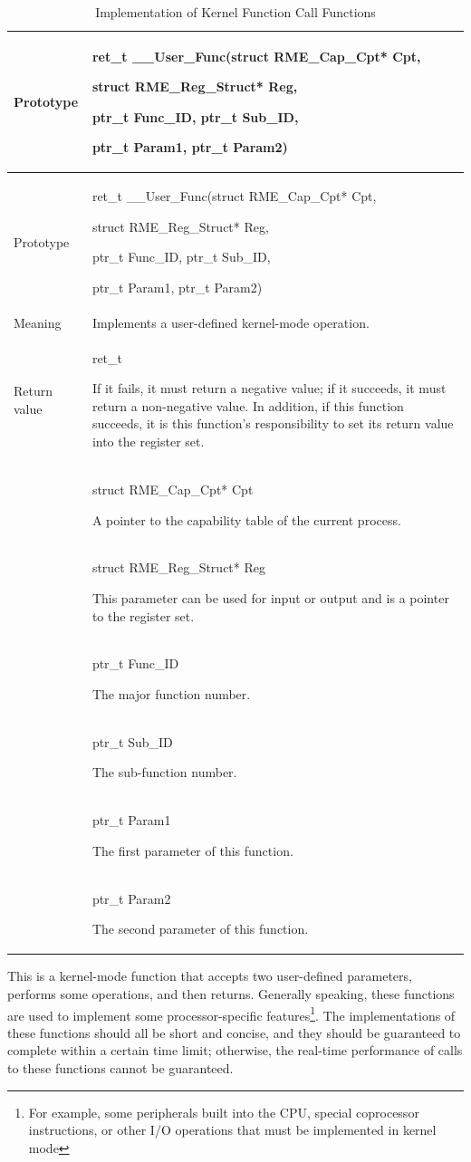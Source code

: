 \begin{xltabular}{\textwidth}{@{}>{\hsize\raggedright\arraybackslash}X>{\hsize\raggedright\arraybackslash}X@{}}
\caption{Implementation of Kernel Function Call Functions}\label{tab:7-73-kernel-function-call-function-implementation}\\
\toprule
Prototype\strut
 & ret\_t \_\_User\_Func(struct RME\_Cap\_Cpt* Cpt,

struct RME\_Reg\_Struct* Reg,

ptr\_t Func\_ID, ptr\_t Sub\_ID,

ptr\_t Param1, ptr\_t Param2)\strut
\tabularnewline
\endfirsthead
\toprule
Prototype\strut
 & ret\_t \_\_User\_Func(struct RME\_Cap\_Cpt* Cpt,

struct RME\_Reg\_Struct* Reg,

ptr\_t Func\_ID, ptr\_t Sub\_ID,

ptr\_t Param1, ptr\_t Param2)\strut
\tabularnewline
\midrule
\endhead
\bottomrule
\endlastfoot
Meaning & Implements a user-defined kernel-mode operation.\tabularnewline
Return value\strut
 & ret\_t

If it fails, it must return a negative value; if it succeeds, it must return a non-negative value. In addition, if this function succeeds, it is this function's responsibility to set its return value into the register set.\strut
\tabularnewline
{} & struct RME\_Cap\_Cpt* Cpt

A pointer to the capability table of the current process.\strut
\tabularnewline
\strut
 & struct RME\_Reg\_Struct* Reg

This parameter can be used for input or output and is a pointer to the register set.\strut
\tabularnewline
\strut
 & ptr\_t Func\_ID

The major function number.\strut
\tabularnewline
\strut
 & ptr\_t Sub\_ID

The sub-function number.\strut
\tabularnewline
\strut
 & ptr\_t Param1

The first parameter of this function.\strut
\tabularnewline
\strut
 & ptr\_t Param2

The second parameter of this function.\strut
\tabularnewline
\end{xltabular}
\nopagebreak[4]

This is a kernel-mode function that accepts two user-defined parameters, performs some operations, and then returns. Generally speaking, these functions are used to implement some processor-specific features\footnote{For example, some peripherals built into the CPU, special coprocessor instructions, or other I/O operations that must be implemented in kernel mode}. The implementations of these functions should all be short and concise, and they should be guaranteed to complete within a certain time limit; otherwise, the real-time performance of calls to these functions cannot be guaranteed.

